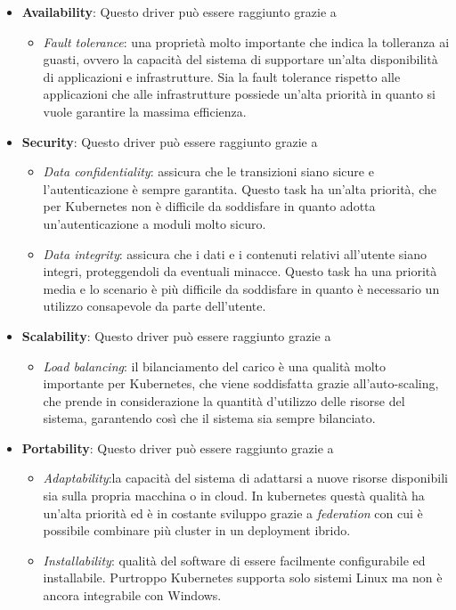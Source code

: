\documentclass[12pt, a4paper]{report}
\begin{document}
\begin{itemize}
  \item \textbf{Availability}: Questo driver può essere raggiunto grazie a
  \begin{itemize}
    \item \textit{Fault tolerance}: una proprietà molto importante che indica la tolleranza ai guasti, ovvero la capacità del sistema di supportare un'alta disponibilità di applicazioni e infrastrutture. Sia la fault tolerance rispetto alle applicazioni che alle infrastrutture possiede un'alta priorità in quanto si vuole garantire la massima efficienza.
  \end{itemize}
  \item \textbf{Security}: Questo driver può essere raggiunto grazie a
  \begin{itemize}
    \item \textit{Data confidentiality}: assicura che le transizioni siano sicure e l'autenticazione è sempre garantita. Questo task ha un'alta priorità, che per Kubernetes non è difficile da soddisfare in quanto adotta un'autenticazione a moduli molto sicuro.
    \item \textit{Data integrity}: assicura che i dati e i contenuti relativi all'utente siano integri, proteggendoli da eventuali minacce. Questo task ha una priorità media e lo scenario è più difficile da soddisfare in quanto è necessario un utilizzo consapevole da parte dell'utente.
  \end{itemize}
  \item \textbf{Scalability}: Questo driver può essere raggiunto grazie a
  \begin{itemize}
    \item \textit{Load balancing}: il bilanciamento del carico è una qualità molto importante per Kubernetes, che viene soddisfatta grazie all'auto-scaling, che prende in considerazione la quantità d'utilizzo delle risorse del sistema, garantendo così che il sistema sia sempre bilanciato.
  \end{itemize}
  \item \textbf{Portability}: Questo driver può essere raggiunto grazie a
  \begin{itemize}
    \item \textit{Adaptability}:la capacità del sistema di adattarsi a nuove risorse disponibili sia sulla propria macchina o in cloud. In kubernetes questà qualità ha un'alta priorità ed è in costante sviluppo grazie a \textit{federation} con cui è possibile combinare più cluster in un deployment ibrido.
    \item \textit{Installability}: qualità del software di essere facilmente configurabile ed installabile. Purtroppo Kubernetes supporta solo sistemi Linux ma non è ancora integrabile con Windows.
  \end{itemize}
\end{itemize}
\end{document}
